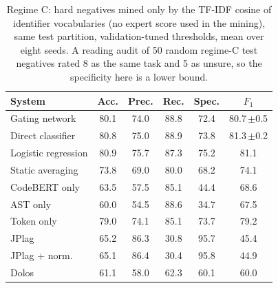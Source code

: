 \begin{table}[t]
\centering
\caption{Regime C: hard negatives mined only by the TF-IDF cosine of identifier vocabularies (no expert score used in the mining), same test partition, validation-tuned thresholds, mean over eight seeds. A reading audit of 50 random regime-C test negatives rated 8 as the same task and 5 as unsure, so the specificity here is a lower bound.}
\label{tab:regime-c}
\footnotesize
\setlength{\tabcolsep}{4pt}
\begin{tabular}{lccccc}
\toprule
\textbf{System} & Acc. & Prec. & Rec. & Spec. & $F_1$ \\
\midrule
Gating network & 80.1 & 74.0 & 88.8 & 72.4 & 80.7\,{\scriptsize$\pm$0.5} \\
Direct classifier & 80.8 & 75.0 & 88.9 & 73.8 & 81.3\,{\scriptsize$\pm$0.2} \\
Logistic regression & 80.9 & 75.7 & 87.3 & 75.2 & 81.1 \\
Static averaging & 73.8 & 69.0 & 80.0 & 68.2 & 74.1 \\
CodeBERT only & 63.5 & 57.5 & 85.1 & 44.4 & 68.6 \\
AST only & 60.0 & 54.5 & 88.6 & 34.7 & 67.5 \\
Token only & 79.0 & 74.1 & 85.1 & 73.7 & 79.2 \\
JPlag & 65.2 & 86.3 & 30.8 & 95.7 & 45.4 \\
JPlag + norm. & 65.1 & 86.4 & 30.4 & 95.8 & 44.9 \\
Dolos & 61.1 & 58.0 & 62.3 & 60.1 & 60.0 \\
\bottomrule
\end{tabular}
\end{table}
